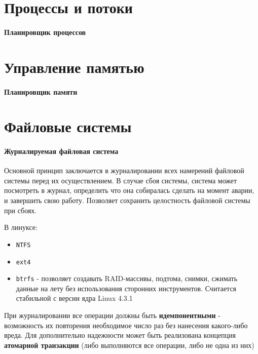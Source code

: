 \documentclass[12pt]{extarticle}
\begin{document}
\tableofcontents
\printindex

\section{Процессы и потоки}
\paragraph{Планировщик процессов}

\section{Управление памятью}
\paragraph{Планировщик памяти}

\section{Файловые системы}
\paragraph{Журналируемая файловая система}
Основной принцип заключается в журналировании всех намерений файловой
системы перед их осуществлением.  В случае сбоя системы, система может
посмотреть в журнал, определить что она собиралась сделать на момент
аварии, и завершить свою работу.
Позволяет сохранить целостность файловой системы при сбоях.
\par В линуксе:
\begin{itemize}
    \item \verb|NTFS|
    \item \verb|ext4|
    \item \verb|btrfs| - позволяет создавать RAID-массивы, подтома,
        снимки, сжимать данные на лету без использования сторонних
        инструментов. Считается стабильной с версии ядра Linux 4.3.1
\end{itemize}
\par При журналировании все операции должны быть
\textbf{идемпонентными} -
возможность их повторения необходимое число раз без нанесения
какого-либо вреда. Для дополнительно надежности может быть реализована
концепция \textbf{атомарной транзакции}
(либо выполняются все операции, либо не одна из них)
\end{document}
